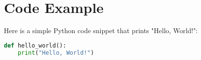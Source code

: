 \section{Code Example}
Here is a simple Python code snippet that prints "Hello, World!":

\begin{lstlisting}[language=Python]
def hello_world():
    print("Hello, World!")
\end{lstlisting}